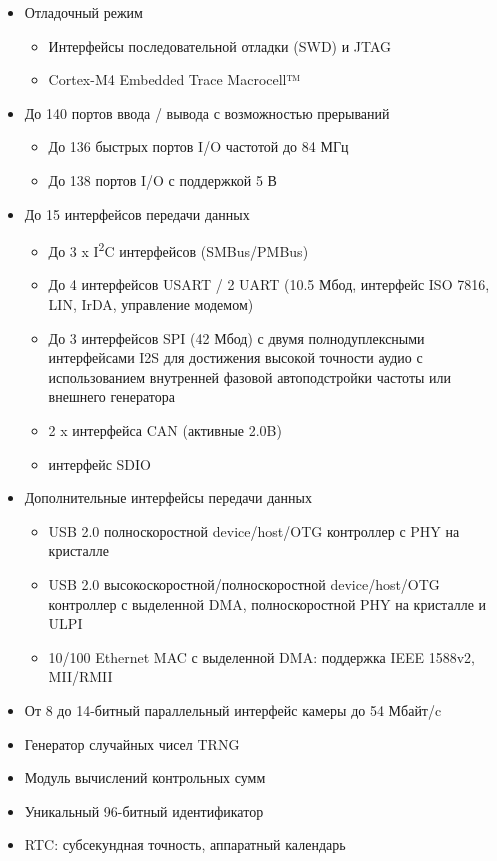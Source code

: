 \documentclass[document.tex]{subfiles}
\begin{document}
\begin{itemize}
	\item Отладочный режим
	\begin{itemize}
		\item Интерфейсы последовательной отладки (SWD) и JTAG
		\item Cortex-M4 Embedded Trace Macrocell™
	\end{itemize}
	\item До 140 портов ввода / вывода с возможностью прерываний
	\begin{itemize}
		\item До 136 быстрых портов I/O частотой до 84 МГц
		\item До 138 портов I/O с поддержкой 5 В
	\end{itemize}
	\item До 15 интерфейсов передачи данных
	\begin{itemize}
		\item До 3 x I\textsuperscript{2}C интерфейсов (SMBus/PMBus)
		\item До 4 интерфейсов USART / 2 UART (10.5 Мбод, интерфейс ISO 7816, LIN, IrDA, управление модемом)
		\item До 3 интерфейсов SPI (42 Мбод) с двумя полнодуплексными интер\-фейсами I2S для достижения высокой точности аудио с использованием внутренней фазовой автоподстройки частоты
		или внешнего генератора
		\item 2 x интерфейса CAN (активные 2.0B)
		\item интерфейс SDIO
	\end{itemize}
	\item Дополнительные интерфейсы передачи данных
	\begin{itemize}
		\item USB 2.0 полноскоростной device/host/OTG
контроллер с PHY на кристалле
		\item USB 2.0 высокоскоростной/полноскоростной
device/host/OTG контрол\-лер с выде\-ленной DMA, полноскоростной PHY на кристалле и ULPI
		\item 10/100 Ethernet MAC с выделенной DMA:
поддержка IEEE 1588v2, MII/RMII
	\end{itemize}
	\item От 8 до 14-битный параллельный интерфейс камеры до 54 Мбайт/c
	\item Генератор случайных чисел TRNG
	\item Модуль вычислений контрольных сумм
	\item Уникальный 96-битный идентификатор
	\item RTC: субсекундная точность, аппаратный календарь\cite{mcu}
\end{itemize}
\end{document}
